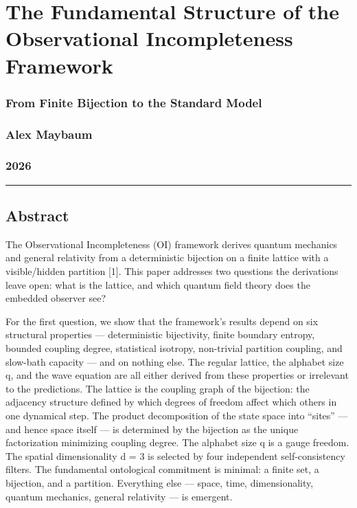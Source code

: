 \documentclass[
  11pt,
]{article}
\author{}
\date{}
\begin{document}
\hypertarget{the-fundamental-structure-of-the-observational-incompleteness-framework}{%
\section{The Fundamental Structure of the Observational Incompleteness
Framework}\label{the-fundamental-structure-of-the-observational-incompleteness-framework}}

\hypertarget{from-finite-bijection-to-the-standard-model}{%
\subsubsection{From Finite Bijection to the Standard
Model}\label{from-finite-bijection-to-the-standard-model}}

\hypertarget{alex-maybaum}{%
\subsubsection{Alex Maybaum}\label{alex-maybaum}}

\hypertarget{section}{%
\subsubsection{2026}\label{section}}

\begin{center}\rule{0.5\linewidth}{0.5pt}\end{center}

\hypertarget{abstract}{%
\subsection{Abstract}\label{abstract}}

The Observational Incompleteness (OI) framework derives quantum
mechanics and general relativity from a deterministic bijection on a
finite lattice with a visible/hidden partition {[}1{]}. This paper
addresses two questions the derivations leave open: what is the lattice,
and which quantum field theory does the embedded observer see?

For the first question, we show that the framework's results depend on
six structural properties --- deterministic bijectivity, finite boundary
entropy, bounded coupling degree, statistical isotropy, non-trivial
partition coupling, and slow-bath capacity --- and on nothing else. The
regular lattice, the alphabet size q, and the wave equation are all
either derived from these properties or irrelevant to the predictions.
The lattice is the coupling graph of the bijection: the adjacency
structure defined by which degrees of freedom affect which others in one
dynamical step. The product decomposition of the state space into
``sites'' --- and hence space itself --- is determined by the bijection
as the unique factorization minimizing coupling degree. The alphabet
size q is a gauge freedom. The spatial dimensionality d = 3 is selected
by four independent self-consistency filters. The fundamental
ontological commitment is minimal: a finite set, a bijection, and a
partition. Everything else --- space, time, dimensionality, quantum
mechanics, general relativity --- is emergent.
\end{document}
